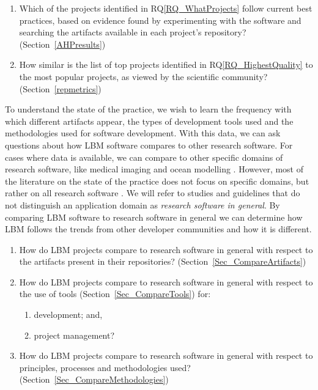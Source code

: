 \documentclass[final, 3p, times, authoryear]{elsarticle}
\newcounter{rqnum} %
\newcommand{\rqref}[1]{RQ\ref{#1}}
\begin{document}
\begin{enumerate}
	\item [RQ\refstepcounter{rqnum}\therqnum \label{RQ_HighestQuality}:] Which
	of the projects identified in \rqref{RQ_WhatProjects} follow current best
	practices, based on evidence found by experimenting with the software and
	searching the artifacts available in each project's repository?
	(Section~\ref{AHPresults})
	\item [RQ\refstepcounter{rqnum}\therqnum \label{RQ_CompareHQ2Popular}:] How
	similar is the list of top projects identified in \rqref{RQ_HighestQuality}
	to the most popular projects, as viewed by the scientific community?
	(Section~\ref{repmetrics})
\end{enumerate}

To understand the state of the practice, we wish to learn the frequency with
which different artifacts appear, the types of development tools used and the
methodologies used for software development.  With this data, we can ask
questions about how LBM software compares to other research software.  For cases
where data is available, we can compare to other specific domains of research
software, like medical imaging \citep{Dong2021} and ocean modelling
\citep{JungEtAl2022}.  However, most of the literature on the state of the
practice does not focus on specific domains, but rather on all research software
\citep{SmithAndMichalski2022}. We will refer to studies and guidelines that do
not distinguish an application domain as \emph{research software in general}. By
comparing LBM software to research software in general we can determine how LBM
follows the trends from other developer communities and how it is different.

\begin{enumerate}
    \item [RQ\refstepcounter{rqnum}\therqnum \label{RQ_CompareArtifacts}:] How
	do LBM projects compare to research software in general with respect to the
	artifacts present in their repositories?
	(Section~\ref{Sec_CompareArtifacts})
	\item [RQ\refstepcounter{rqnum}\therqnum \label{RQ_CompareToolsProjMngmnt}:]
	How do LBM projects compare to research software in general with respect to
	the use of tools (Section~\ref{Sec_CompareTools}) for:
	\begin{enumerate} 
		\item [\rqref{RQ_CompareToolsProjMngmnt}.a] development; and,
		\item [\rqref{RQ_CompareToolsProjMngmnt}.b] project management?
	\end{enumerate}
	\item [RQ\refstepcounter{rqnum}\therqnum \label{RQ_CompareMethodologies}:]
	How do LBM projects compare to research software in general with respect to
	principles, processes and methodologies used?
	(Section~\ref{Sec_CompareMethodologies})
\end{enumerate}	
\end{document}
